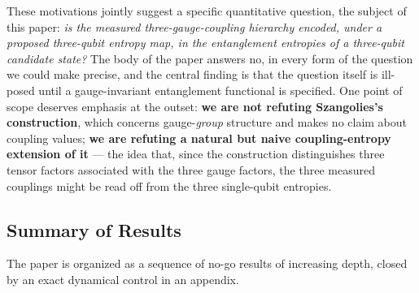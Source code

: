 \documentclass[11pt]{article}
\begin{document}
These motivations jointly suggest a specific quantitative question, the subject of this paper: \emph{is the measured three-gauge-coupling hierarchy encoded, under a proposed three-qubit entropy map, in the entanglement entropies of a three-qubit candidate state?} The body of the paper answers no, in every form of the question we could make precise, and the central finding is that the question itself is ill-posed until a gauge-invariant entanglement functional is specified. One point of scope deserves emphasis at the outset: \textbf{we are not refuting Szangolies's construction}, which concerns gauge-\emph{group} structure and makes no claim about coupling values; \textbf{we are refuting a natural but naive coupling-entropy extension of it} --- the idea that, since the construction distinguishes three tensor factors associated with the three gauge factors, the three measured couplings might be read off from the three single-qubit entropies.

\subsection{Summary of Results}
\label{sec:summary}

The paper is organized as a sequence of no-go results of increasing depth, closed by an exact dynamical control in an appendix.
\end{document}
